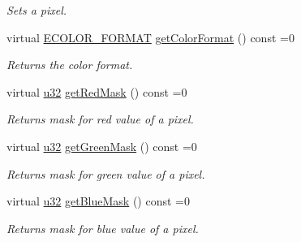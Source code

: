 \begin{DoxyCompactItemize}
\begin{DoxyCompactList}\small\item\em Sets a pixel. \end{DoxyCompactList}\item 
\mbox{\label{classirr_1_1video_1_1IImage_ad045a8d172047411d03e167b201ae8a6}} 
virtual \hyperlink{namespaceirr_1_1video_a1d5e487888c32b1674a8f75116d829ed}{E\+C\+O\+L\+O\+R\+\_\+\+F\+O\+R\+M\+AT} \hyperlink{classirr_1_1video_1_1IImage_ad045a8d172047411d03e167b201ae8a6}{get\+Color\+Format} () const =0
\begin{DoxyCompactList}\small\item\em Returns the color format. \end{DoxyCompactList}\item 
\mbox{\label{classirr_1_1video_1_1IImage_aaf3a93ad19466928da82f54d8f286990}} 
virtual \hyperlink{namespaceirr_a0416a53257075833e7002efd0a18e804}{u32} \hyperlink{classirr_1_1video_1_1IImage_aaf3a93ad19466928da82f54d8f286990}{get\+Red\+Mask} () const =0
\begin{DoxyCompactList}\small\item\em Returns mask for red value of a pixel. \end{DoxyCompactList}\item 
\mbox{\label{classirr_1_1video_1_1IImage_a1a12d75385fa9e0a063141c9ae0e4289}} 
virtual \hyperlink{namespaceirr_a0416a53257075833e7002efd0a18e804}{u32} \hyperlink{classirr_1_1video_1_1IImage_a1a12d75385fa9e0a063141c9ae0e4289}{get\+Green\+Mask} () const =0
\begin{DoxyCompactList}\small\item\em Returns mask for green value of a pixel. \end{DoxyCompactList}\item 
\mbox{\label{classirr_1_1video_1_1IImage_a3554ed18eb6e79213f6330d19006e9e8}} 
virtual \hyperlink{namespaceirr_a0416a53257075833e7002efd0a18e804}{u32} \hyperlink{classirr_1_1video_1_1IImage_a3554ed18eb6e79213f6330d19006e9e8}{get\+Blue\+Mask} () const =0
\begin{DoxyCompactList}\small\item\em Returns mask for blue value of a pixel. \end{DoxyCompactList}\item 

\end{DoxyCompactItemize}
